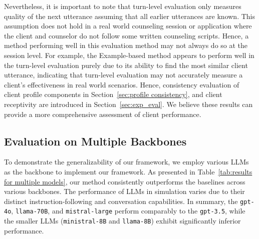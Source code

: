 Nevertheless, it is important to note that turn-level evaluation only measures quality of the next utterance assuming that all earlier utterances are known.  This assumption does not hold in a real world counseling session or application where the client and counselor do not follow some written counseling scripts. Hence, a method performing well in this evaluation method may not always do so at the session level.  For example, the Example-based method appears to perform well in the turn-level evaluation purely due to its ability to find the most similar client utterance, indicating that turn-level evaluation may not accurately measure a client's effectiveness in real world scenarios. Hence, consistency evaluation of client profile components in Section~\ref{sec:profile consistency}, and client receptivity are introduced in Section~\ref{sec:exp_eval}. We believe these results can provide a more comprehensive assessment of client performance.

\subsection{Evaluation on Multiple Backbones}

To demonstrate the generalizability of our framework, we employ various LLMs as the backbone to implement our framework. As presented in Table~\ref{tab:results for multiple models}, our method consistently outperforms the baselines across various backbones. The performance of LLMs in simulation varies due to their distinct instruction-following and conversation capabilities. In summary, the \texttt{gpt-4o}, \texttt{llama-70B}, and \texttt{mistral-large} perform comparably to the \texttt{gpt-3.5}, while the smaller LLMs (\texttt{ministral-8B} and \texttt{llama-8B}) exhibit significantly inferior performance.

